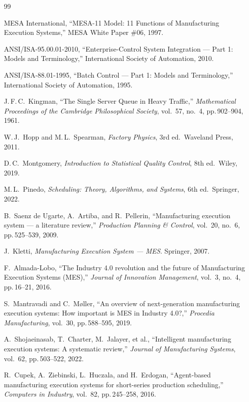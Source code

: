 \documentclass[11pt]{article}
\begin{document}
\begin{thebibliography}{99}

 MESA International, ``MESA-11 Model: 11 Functions of Manufacturing Execution Systems,'' MESA White Paper \#06, 1997.

 ANSI/ISA-95.00.01-2010, ``Enterprise-Control System Integration --- Part 1: Models and Terminology,'' International Society of Automation, 2010.

 ANSI/ISA-88.01-1995, ``Batch Control --- Part 1: Models and Terminology,'' International Society of Automation, 1995.

 J.\,F.\,C.\ Kingman, ``The Single Server Queue in Heavy Traffic,'' \textit{Mathematical Proceedings of the Cambridge Philosophical Society}, vol.~57, no.~4, pp.\,902--904, 1961.

 W.\,J.\ Hopp and M.\,L.\ Spearman, \textit{Factory Physics}, 3rd ed.\ Waveland Press, 2011.

 D.\,C.\ Montgomery, \textit{Introduction to Statistical Quality Control}, 8th ed.\ Wiley, 2019.

 M.\,L.\ Pinedo, \textit{Scheduling: Theory, Algorithms, and Systems}, 6th ed.\ Springer, 2022.

 B.\ Saenz de Ugarte, A.\ Artiba, and R.\ Pellerin, ``Manufacturing execution system --- a literature review,'' \textit{Production Planning \& Control}, vol.~20, no.~6, pp.\,525--539, 2009.

 J.\ Kletti, \textit{Manufacturing Execution System --- MES}. Springer, 2007.

 F.\ Almada-Lobo, ``The Industry 4.0 revolution and the future of Manufacturing Execution Systems (MES),'' \textit{Journal of Innovation Management}, vol.~3, no.~4, pp.\,16--21, 2016.

 S.\ Mantravadi and C.\ M{\o}ller, ``An overview of next-generation manufacturing execution systems: How important is MES in Industry 4.0?,'' \textit{Procedia Manufacturing}, vol.~30, pp.\,588--595, 2019.

 A.\ Shojaeinasab, T.\ Charter, M.\ Jalayer, et al., ``Intelligent manufacturing execution systems: A systematic review,'' \textit{Journal of Manufacturing Systems}, vol.~62, pp.\,503--522, 2022.

 R.\ Cupek, A.\ Ziebinski, L.\ Huczala, and H.\ Erdogan, ``Agent-based manufacturing execution systems for short-series production scheduling,'' \textit{Computers in Industry}, vol.~82, pp.\,245--258, 2016.


\end{thebibliography}
\end{document}
